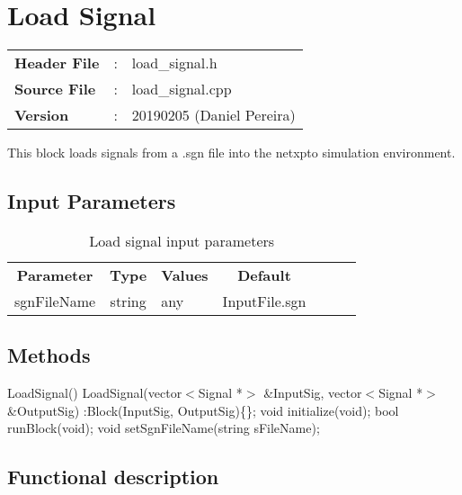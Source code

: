 \clearpage

\section{Load Signal}

\begin{tcolorbox}	
	\begin{tabular}{p{2.75cm} p{0.2cm} p{10.5cm}} 	
		\textbf{Header File}   &:& load\_signal.h \\
		\textbf{Source File}   &:& load\_signal.cpp \\
        \textbf{Version}       &:& 20190205 (Daniel Pereira)\\
	\end{tabular}
\end{tcolorbox}

This block loads signals from a .sgn file into the netxpto simulation environment.

\subsection*{Input Parameters}

\begin{table}[h]
	\centering
	\begin{tabular}{|c|c|p{60mm}|c|ccc}
		\cline{1-4}
		\textbf{Parameter} & \textbf{Type}   & \textbf{Values} &   \textbf{Default}  \\ \cline{1-4}
		sgnFileName        & string          & any             & InputFile.sgn       \\ \cline{1-4}
	\end{tabular}
	\caption{Load signal input parameters} 
	\label{table:LoadSignal_in_par}
\end{table}

\subsection*{Methods}

LoadSignal() {}
\bigbreak
LoadSignal(vector$<$Signal *$>$ \&InputSig, vector$<$Signal *$>$ \&OutputSig) :Block(InputSig, OutputSig)\{\};
\bigbreak
void initialize(void);
\bigbreak
bool runBlock(void);
\bigbreak
void setSgnFileName(string sFileName);

\subsection*{Functional description}

